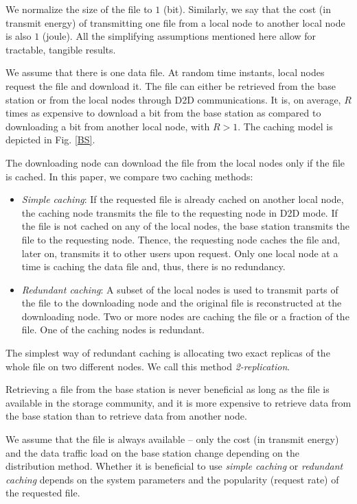 \documentclass[10pt,conference]{IEEEtran}
\begin{document}
We normalize the size of the file to $1$ (bit). Similarly, we say that the cost (in
transmit energy) of transmitting one file from a local node to
another local node is also $1$ (joule). All the simplifying
assumptions mentioned here allow for tractable, tangible results.

We assume that there is one data file. At random time instants, local nodes request the file and download it. The file can either be retrieved from the base station or from the
local nodes through D2D communications. It is, on average, $R$ times as
expensive to download a bit from the base station as compared to
downloading a bit from another local node, with $R>1$. The caching
model is depicted in Fig. \ref{BS}. 

The downloading node can download the file from the local nodes only
if the file is cached. In this paper, we compare two caching methods:
\begin{itemize}
\item \emph{Simple caching}: If the requested file is already cached on another local node, the caching node transmits the file to the requesting node in D2D mode. If the file is not cached on any of the local nodes, the base station transmits the file to the requesting node. Thence, the requesting node caches the file and, later on, transmits it to other users upon request. Only one local node at a time is caching the data file and, thus, there is no redundancy.
\item \emph{Redundant caching}: A subset of the local nodes is used to transmit parts of the file to the downloading node and the original file is reconstructed at the downloading node. Two or more nodes are caching the file or a fraction of the file. One of the caching nodes is redundant.
\end{itemize}
The simplest way of redundant caching is allocating two exact replicas
of the whole file on two different nodes. We call this method
\emph{2-replication}.

Retrieving a file from the base station is never beneficial as long as
the file is available in the storage community, and it is more
expensive to retrieve data from the base station than to retrieve data from another
node. 

We assume that the file is always available -- only the cost (in
transmit energy) and the data traffic load on the base station change
depending on the distribution method. Whether it is beneficial to use
\emph{simple caching} or \emph{redundant caching} depends on the
system parameters and the popularity (request rate) of the requested file.
\end{document}

